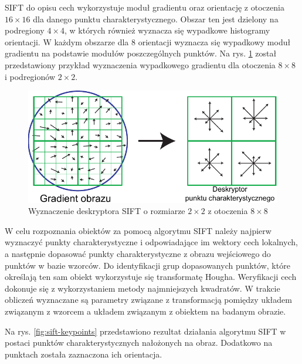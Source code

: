 SIFT do opisu cech wykorzystuje moduł gradientu oraz orientację z otoczenia $16 \times 16$ dla danego punktu charakterystycznego. Obszar ten jest dzielony na podregiony $4 \times 4$, w których również wyznacza się wypadkowe histogramy orientacji. W każdym obszarze dla 8 orientacji wyznacza się wypadkowy moduł gradientu na podstawie modułów poszczególnych punktów. Na rys. \ref{fig:sift-descriptor} został przedstawiony przykład wyznaczenia wypadkowego gradientu dla otoczenia $8 \times 8$ i podregionów $2 \times 2$.

\begin{figure}[h]
	\centering
	\includegraphics[scale=1]{graphics/01_podstawy_teoretyczne/sift-descriptor.pdf}
	\caption{Wyznaczenie deskryptora SIFT o rozmiarze $2 \times 2$ z otoczenia $8 \times 8$ \cite{LOWE04}}
	\label{fig:sift-descriptor}
\end{figure}

W celu rozpoznania obiektów za pomocą algorytmu SIFT należy najpierw wyznaczyć punkty charakterystyczne i odpowiadające im wektory cech lokalnych, a następnie dopasować punkty charakterystyczne z obrazu wejściowego do punktów w bazie wzorców. Do identyfikacji grup dopasowanych punktów, które określają ten sam obiekt wykorzystuje się transformatę Hougha. Weryfikacji cech dokonuje się z wykorzystaniem metody najmniejszych kwadratów. W trakcie obliczeń wyznaczane są parametry związane z transformacją pomiędzy układem związanym z wzorcem a układem związanym z obiektem na badanym obrazie.

Na rys. \ref{fig:sift-keypoints} przedstawiono rezultat działania algorytmu SIFT w postaci punktów charakterystycznych nałożonych na obraz. Dodatkowo na punktach została zaznaczona ich orientacja.

